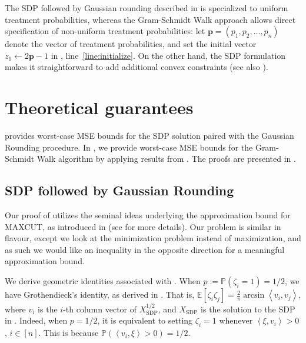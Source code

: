 \documentclass[12pt]{article}
\theoremstyle{definition}
\numberwithin{equation}{section}
\numberwithin{figure}{section}
\newcommand\dotp[1]{\left\langle #1 \right\rangle}
\numberwithin{equation}{section}
\numberwithin{figure}{section}
\begin{document}
The SDP followed by Gaussian rounding described in  is specialized to uniform treatment probabilities, whereas the Gram-Schmidt Walk approach allows direct specification of non-uniform treatment probabilities: let $\mathbf{p} = (p_1, p_2, \ldots, p_n)$ denote the vector of treatment probabilities, and set the initial vector $z_1 \leftarrow 2\mathbf{p}-1$ in , line~\ref{line:initialize}. On the other hand, the SDP formulation makes it straightforward to add additional convex constraints (see also ).

\section{Theoretical guarantees}
 provides worst-case MSE bounds for the SDP solution paired with the Gaussian Rounding procedure. In , we provide worst-case MSE bounds for the Gram-Schmidt Walk algorithm by applying results from \citet{harshaw2024balancing}. The proofs are presented in .

\subsection{SDP followed by Gaussian Rounding}
Our proof of  utilizes the seminal ideas underlying the approximation bound for MAXCUT, as introduced in \citet{goemans1995improved} (see  for more details). Our problem is similar in flavour, except we look at the minimization problem instead of maximization, and as such we would like an inequality in the opposite direction for a meaningful approximation bound.

We derive geometric identities associated with .
When $p:= \mathbb{P}(\zeta_i = 1) =1/2$, we have Grothendieck's identity, as derived in \citet{goemans1995improved}. That is, 
$\mathbb{E}[\zeta_i \zeta_j] = \frac{2}{\pi} \arcsin{\dotp{v_i, v_j}}$,
where $v_i$ is the $i$-th column vector of $X_{\text{SDP}}^{1/2}$, and $X_{\text{SDP}}$ is the solution to the SDP in .
Indeed, when $p=1/2$, it is equivalent to setting $\zeta_i = 1$ whenever $\dotp{\xi, v_i} > 0$, $i \in [n]$. This is because $\mathbb{P}(\dotp{v_i, \xi} > 0) = 1/2.$ 
\end{document}
